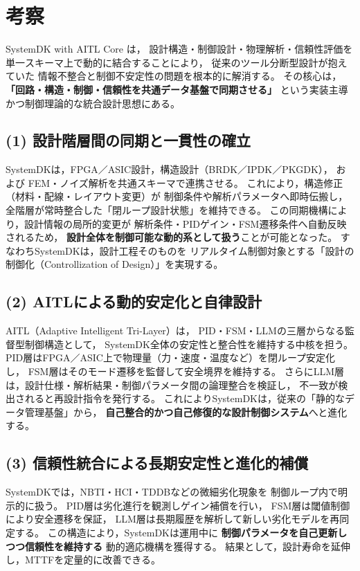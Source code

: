 \section{考察}

SystemDK with AITL Core は，
設計構造・制御設計・物理解析・信頼性評価を
単一スキーマ上で動的に結合することにより，
従来のツール分断型設計が抱えていた
情報不整合と制御不安定性の問題を根本的に解消する。
その核心は，\textbf{「回路・構造・制御・信頼性を共通データ基盤で同期させる」}
という実装主導かつ制御理論的な統合設計思想にある。

\subsection{(1) 設計階層間の同期と一貫性の確立}
SystemDKは，FPGA／ASIC設計，構造設計（BRDK／IPDK／PKGDK），
および FEM・ノイズ解析を共通スキーマで連携させる。
これにより，構造修正（材料・配線・レイアウト変更）が
制御条件や解析パラメータへ即時伝搬し，
全階層が常時整合した「閉ループ設計状態」を維持できる。
この同期機構により，設計情報の局所的変更が
解析条件・PIDゲイン・FSM遷移条件へ自動反映されるため，
\textbf{設計全体を制御可能な動的系として扱う}ことが可能となった。
すなわちSystemDKは，設計工程そのものを
リアルタイム制御対象とする「設計の制御化（Controllization of Design）」を実現する。

\subsection{(2) AITLによる動的安定化と自律設計}
AITL（Adaptive Intelligent Tri-Layer）は，
PID・FSM・LLMの三層からなる監督型制御構造として，
SystemDK全体の安定性と整合性を維持する中核を担う。
PID層はFPGA／ASIC上で物理量（力・速度・温度など）を閉ループ安定化し，
FSM層はそのモード遷移を監督して安全境界を維持する。
さらにLLM層は，設計仕様・解析結果・制御パラメータ間の論理整合を検証し，
不一致が検出されると再設計指令を発行する。
これによりSystemDKは，従来の「静的なデータ管理基盤」から，
\textbf{自己整合的かつ自己修復的な設計制御システム}へと進化する。

\subsection{(3) 信頼性統合による長期安定性と進化的補償}
SystemDKでは，NBTI・HCI・TDDBなどの微細劣化現象を
制御ループ内で明示的に扱う。
PID層は劣化進行を観測しゲイン補償を行い，
FSM層は閾値制御により安全遷移を保証，
LLM層は長期履歴を解析して新しい劣化モデルを再同定する。
この構造により，SystemDKは運用中に
\textbf{制御パラメータを自己更新しつつ信頼性を維持する}
動的適応機構を獲得する。
結果として，設計寿命を延伸し，MTTFを定量的に改善できる。

